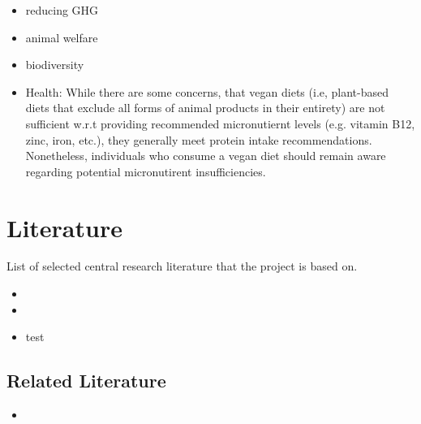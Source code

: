 \documentclass{article}
\begin{document}
\begin{itemize}
\item reducing GHG
\item animal welfare
\item biodiversity
\item Health: While there are some concerns, that vegan diets (i.e, plant-based diets that exclude all forms of animal products in their entirety) are not sufficient w.r.t providing recommended micronutiernt levels (e.g. vitamin B12, zinc, iron, etc.), they generally meet protein intake recommendations. Nonetheless, individuals who consume a vegan diet should remain aware regarding potential micronutirent insufficiencies. 
\end{itemize}



\section*{Literature}

List of selected central research literature that the project is based on.


\begin{itemize}
  \item {}
  \item {}
  \item test \citet{WHO2021}
\end{itemize}

\subsection{Related Literature}
\begin{itemize}
  \item {}
\end{itemize}


{\small


}
\end{document}
